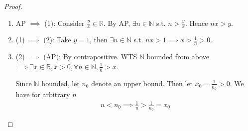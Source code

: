 \begin{proof}
    \begin{enumerate}
    \item AP $\implies$ (1): Consider $\frac{y}{x} \in \mathbb{R}$. By AP, 
$\exists n \in \mathbb{N}$ s.t. $n > \frac{y}{x}$. Hence $nx > y$. 
    \item (1) $\implies$ (2): Take $y = 1$, then $\exists n \in \mathbb{N}$ s.t. 
$nx > 1 \implies x > \frac{1}{n} > 0$. 
    \item (2) $\implies$ (AP): By contrapositive. WTS $\mathbb{N}$ bounded from above 
$\implies \exists x \in \mathbb{R}, x > 0, \forall n \in \mathbb{N}, \frac{1}{n} > x$. 
\medskip 

Since $\mathbb{N}$ bounded, let $n_0$ denote an upper bound. Then let $x_0 = \frac{1}{n_0} > 0$. 
We have for arbitrary $n$
\begin{align*}
    n < n_0  \implies \frac{1}{n} > \frac{1}{n_0}  = x_0 
\end{align*}
    \end{enumerate}
\end{proof}
